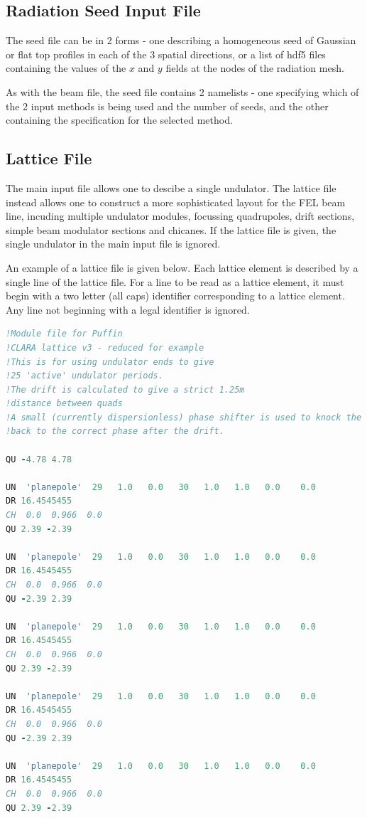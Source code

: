 \documentclass[12pt]{article}%
\begin{document}
\newpage

\subsection{Radiation Seed Input File}

The seed file can be in 2 forms - one describing a homogeneous seed of Gaussian or flat top profiles in each of the 3 spatial directions, or a list of hdf5 files containing the values of the $x$ and $y$ fields at the nodes of the radiation mesh.

As with the beam file, the seed file contains 2 namelists - one specifying which of the 2 input methods is being used and the number of seeds, and the other containing the specification for the selected method.


\newpage

\subsection{Lattice File}

The main input file allows one to descibe a single undulator. The lattice file instead allows one to construct a more sophisticated layout for the FEL beam line, incuding multiple undulator modules, focussing quadrupoles, drift sections, simple beam modulator sections and chicanes. If the lattice file is given, the single undulator in the main input file is ignored.

An example of a lattice file is given below. Each lattice element is described by a single line of the lattice file. For a line to be read as a lattice element, it must begin with a two letter (all caps) identifier corresponding to a lattice element. Any line not beginning with a legal identifier is ignored.

\lstset{style=mystyle}
\begin{lstlisting}[language=fortran, caption=Example lattice file.]
!Module file for Puffin
!CLARA lattice v3 - reduced for example
!This is for using undulator ends to give
!25 'active' undulator periods.
!The drift is calculated to give a strict 1.25m
!distance between quads
!A small (currently dispersionless) phase shifter is used to knock the beam
!back to the correct phase after the drift.

QU -4.78 4.78

UN  'planepole'  29   1.0   0.0   30   1.0   1.0   0.0    0.0
DR 16.4545455
CH  0.0  0.966  0.0
QU 2.39 -2.39

UN  'planepole'  29   1.0   0.0   30   1.0   1.0   0.0    0.0
DR 16.4545455
CH  0.0  0.966  0.0
QU -2.39 2.39

UN  'planepole'  29   1.0   0.0   30   1.0   1.0   0.0    0.0
DR 16.4545455
CH  0.0  0.966  0.0
QU 2.39 -2.39

UN  'planepole'  29   1.0   0.0   30   1.0   1.0   0.0    0.0
DR 16.4545455
CH  0.0  0.966  0.0
QU -2.39 2.39

UN  'planepole'  29   1.0   0.0   30   1.0   1.0   0.0    0.0
DR 16.4545455
CH  0.0  0.966  0.0
QU 2.39 -2.39

\end{lstlisting}
\end{document}
